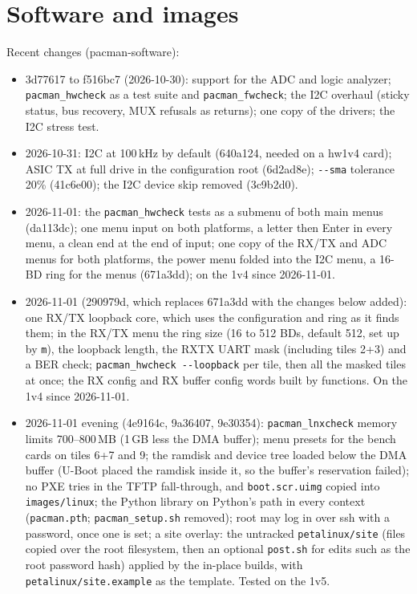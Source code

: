 \documentclass[11pt]{article}
\newcommand{\h}[1]{\texttt{#1}}
\begin{document}
\section{Software and images}

Recent changes (pacman-software):
\begin{itemize}
\item 3d77617 to f516bc7 (2026-10-30): support for the ADC and logic analyzer; \h{pacman\_hwcheck} as a test suite
  and \h{pacman\_fwcheck}; the I2C overhaul (sticky status, bus recovery, MUX refusals as returns); one copy of the
  drivers; the I2C stress test.
\item 2026-10-31: I2C at 100\,kHz by default (640a124, needed on a hw1v4 card); ASIC TX at full drive in the
  configuration root (6d2ad8e); \h{-{}-sma} tolerance 20\% (41c6e00); the I2C device skip removed (3c9b2d0).
\item 2026-11-01: the \h{pacman\_hwcheck} tests as a submenu of both main menus (da113dc); one menu input on both
  platforms, a letter then Enter in every menu, a clean end at the end of input; one copy of the RX/TX and ADC menus for both platforms, the power menu folded
  into the I2C menu, a 16-BD ring for the menus (671a3dd);  on the 1v4 since 2026-11-01.
\item 2026-11-01 (290979d, which replaces 671a3dd with the changes below added): one RX/TX loopback core, which uses the configuration and ring as it finds them; in the
  RX/TX menu the ring size (16 to 512 BDs, default 512, set up by \h{m}), the loopback length, the RXTX UART mask
  (including tiles 2+3) and a BER check; \h{pacman\_hwcheck -{}-loopback} per tile, then all the masked tiles at
  once; the RX config and RX buffer config words built by functions.  On the 1v4 since 2026-11-01.
\item 2026-11-01 evening (4e9164c, 9a36407, 9e30354): \h{pacman\_lnxcheck} memory limits 700--800\,MB (1\,GB less
  the DMA buffer); menu presets for the bench cards on tiles 6+7 and 9; the ramdisk and device tree loaded below the
  DMA buffer (U-Boot placed the ramdisk inside it, so the buffer's reservation failed); no PXE tries in the TFTP
  fall-through, and \h{boot.scr.uimg} copied into \h{images/linux}; the Python library on Python's path in every
  context (\h{pacman.pth}; \h{pacman\_setup.sh} removed); root may log in over ssh with a password, once one is set;
  a site overlay: the untracked \h{petalinux/site} (files copied over the root filesystem, then an optional
  \h{post.sh} for edits such as the root password hash) applied by the in-place builds, with \h{petalinux/site.example}
  as the template.  Tested on the 1v5.
\end{itemize}
\end{document}
